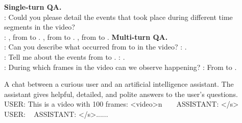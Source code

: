 \documentclass[10pt,twocolumn,letterpaper]{article}
\begin{document}
\begin{figure*}[t] 
\centering
\begin{tcolorbox}[colback=gray!20, colframe=black, text width=0.8\textwidth, title={\small Box 1: Examples of both single-turn and multi-turn QA for a video containing three events.}, fontupper=\small, fontlower=\small]
\hypertarget{box1}{}

\textbf{Single-turn QA.} \\
\textcolor{red}{}: Could you please detail the events that took place during different time segments in the video? \\
\textcolor{red}{}: \textcolor{blue}{}, from \textcolor{blue}{} to \textcolor{blue}{}. \textcolor{blue}{}, from \textcolor{blue}{} to \textcolor{blue}{}. \textcolor{blue}{}, from \textcolor{blue}{} to \textcolor{blue}{}. 
\tcblower
\textbf{Multi-turn QA.} \\
\textcolor{red}{}: Can you describe what occurred from \textcolor{blue}{} to \textcolor{blue}{} in the video? \textcolor{red}{}: \textcolor{blue}{}. \\
\textcolor{red}{}: Tell me about the events from \textcolor{blue}{} to \textcolor{blue}{}. \textcolor{red}{}: \textcolor{blue}{}. \\
\textcolor{red}{}: During which frames in the video can we observe \textcolor{blue}{} happening? \textcolor{red}{}: From \textcolor{blue}{} to \textcolor{blue}{}.
\end{tcolorbox}
\end{figure*}




\begin{figure*}[t] 
\centering
\begin{tcolorbox}[colback=gray!20, colframe=black, text width=0.8\textwidth, center, title={\small Box 2: The inputs to VTimeLLM in Stage 2 and Stage 3}, fontupper=\small, fontlower=\small]
\hypertarget{box2}{}
A chat between a curious user and an artificial intelligence assistant. The assistant gives helpful, detailed, and polite answers to the user's questions. \\
USER: This is a video with 100 frames: \textless video\textgreater n ~ \textcolor{red}{} ~ ASSISTANT: \textcolor{red}{}\textless /s\textgreater \\
USER: \textcolor{red}{} ~ ASSISTANT: \textcolor{red}{}\textless /s\textgreater ......
\end{tcolorbox}
\end{figure*}
\end{document}
